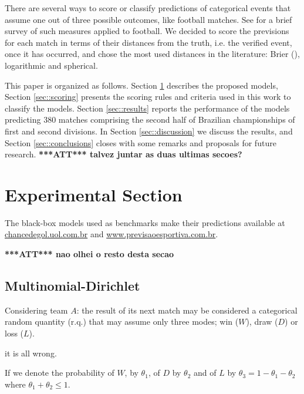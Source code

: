 \documentclass[journal,article,accept,moreauthors,pdftex,12pt,a4paper]{mdpi}
\newcommand{\red}[1]{\textbf{\color{red} ***ATT*** #1}}
\begin{document}
There are several ways to score or classify predictions of categorical events that assume one out of three possible outcomes, like football matches.
See \cite{constantinou} for a brief survey of such measures applied to football.
We decided to score the previsions for each match in terms of their distances from the truth, i.e. the verified event, once it has occurred, and chose the most used distances in the literature: Brier (\cite{brier1950}), logarithmic and spherical.

This paper is organized as follows.
Section \ref{sec::experimental} describes the proposed models, Section \ref{sec::scoring} presents the scoring rules and criteria used in this work to classify the models.
Section \ref{sec::results} reports the performance of the models predicting 380 matches comprising the second half of Brazilian championships of first and second divisions.
In Section \ref{sec::discussion} we discuss the results, and Section \ref{sec::conclusions} closes with some remarks and proposals for future research.
\red{talvez juntar as duas ultimas secoes?}



\section{Experimental Section}
\label{sec::experimental}

The black-box models used as benchmarks make their predictions available at \url{chancedegol.uol.com.br} and \url{www.previsaoesportiva.com.br}.


\red{nao olhei o resto desta secao}

\subsection{Multinomial-Dirichlet}

Considering team $A$: the result of its next match may be considered a categorical random quantity (r.q.) that may assume only three modes; win ($W$), draw ($D$) or loss ($L$).

it is all wrong.

If we denote the probability of $W$, by $\theta_1$, of $D$ by $\theta_2$ and of $L$ by $\theta_3=1-\theta_1-\theta_2$ where $\theta_1+\theta_2\leq 1$.
\end{document}
